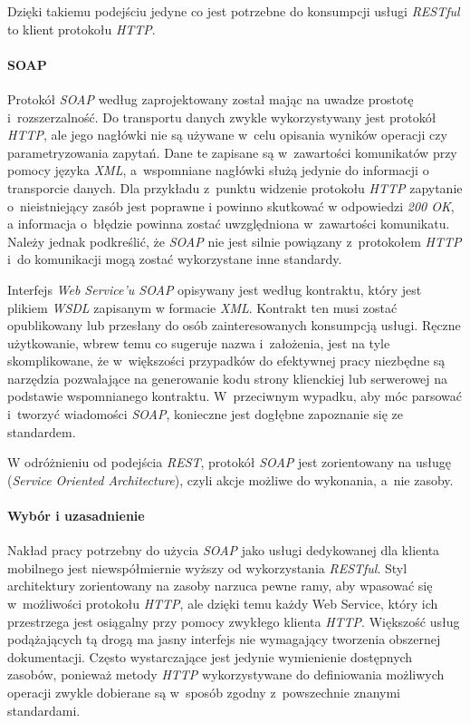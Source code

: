\documentclass[11pt]{aghdpl}
\begin{document}
Dzięki takiemu podejściu jedyne co jest potrzebne do konsumpcji usługi \emph{RESTful} to klient protokołu \emph{HTTP}.

\paragraph{SOAP}

Protokół \emph{SOAP} według \cite{W3Soap} zaprojektowany został mając na uwadze prostotę i~rozszerzalność. Do transportu danych zwykle wykorzystywany jest protokół \emph{HTTP}, ale jego nagłówki nie są używane w~celu opisania wyników operacji czy parametryzowania zapytań. Dane te zapisane są w~zawartości komunikatów przy pomocy języka \emph{XML}, a~wspomniane nagłówki służą jedynie do informacji o transporcie danych. Dla przykładu z~punktu widzenie protokołu \emph{HTTP} zapytanie o~nieistniejący zasób jest poprawne i powinno skutkować w odpowiedzi \emph{200 OK}, a informacja o~błędzie powinna zostać uwzględniona w~zawartości komunikatu. Należy jednak podkreślić, że \emph{SOAP} nie jest silnie powiązany z~protokołem \emph{HTTP} i~do komunikacji mogą zostać wykorzystane inne standardy.

Interfejs \emph{Web Service'u SOAP} opisywany jest według kontraktu, który jest plikiem \emph{WSDL} zapisanym w formacie \emph{XML}. Kontrakt ten musi zostać opublikowany lub przesłany do osób zainteresowanych konsumpcją usługi. Ręczne użytkowanie, wbrew temu co sugeruje nazwa i~założenia, jest na tyle skomplikowane, że w~większości przypadków do efektywnej pracy niezbędne są narzędzia pozwalające na generowanie kodu strony klienckiej lub serwerowej na podstawie wspomnianego kontraktu. W~przeciwnym wypadku, aby móc parsować i~tworzyć wiadomości \emph{SOAP}, konieczne jest dogłębne zapoznanie się ze standardem.

W odróżnieniu od podejścia \emph{REST}, protokół \emph{SOAP} jest zorientowany na usługę (\emph{Service Oriented Architecture}), czyli akcje możliwe do wykonania, a~nie zasoby.

\paragraph{Wybór i uzasadnienie}

Nakład pracy potrzebny do użycia \emph{SOAP} jako usługi dedykowanej dla klienta mobilnego jest niewspółmiernie wyższy od wykorzystania \emph{RESTful}. Styl architektury zorientowany na zasoby narzuca pewne ramy, aby wpasować się w~możliwości protokołu \emph{HTTP}, ale dzięki temu każdy Web Service, który ich przestrzega jest osiągalny przy pomocy zwykłego klienta \emph{HTTP}. Większość usług podążających tą drogą ma jasny interfejs nie wymagający tworzenia obszernej dokumentacji. Często wystarczające jest jedynie wymienienie dostępnych zasobów, ponieważ metody \emph{HTTP} wykorzystywane do definiowania możliwych operacji zwykle dobierane są w~sposób zgodny z~powszechnie znanymi standardami.
\end{document}
